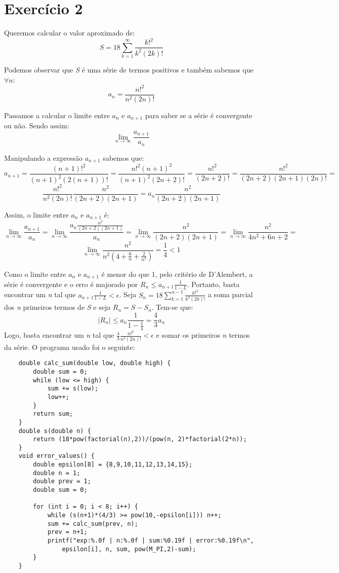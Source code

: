 \documentclass[12pt, letterpaper]{article}
\begin{document}
\section*{Exercício 2}
Queremos calcular o valor aproximado de:
\[S=18\sum_{k=1}^{\infty}\frac{k!^2}{k^2(2k)!}\]

Podemos observar que \textit{S} é uma série de termos positivos e também sabemos que $\forall n$:
$$a_n = \frac{n!^2}{n^2(2n)!}$$
\newline

Passamos a calcular o limite entre $a_n$ e $a_{n+1}$ para saber se a série é convergente ou não. Sendo assim: 
$$\lim_{n \to \infty} \frac{a_{n+1}}{a_n}$$
\newline

Manipulando a expressão $a_{n+1}$ sabemos que:
$$a_{n+1} = \frac{(n+1)!^2}{(n+1)^2(2(n+1))!} = \frac{n!^2(n+1)^2}{(n+1)^2(2n+2)!} = \frac{n!^2}{(2n+2)!} = \frac{n!^2}{(2n+2)(2n+1)(2n)!} =$$
$$\frac{n!^2}{n^2(2n)!} \frac{n^2}{(2n+2)(2n+1)} = a_n\frac{n^2}{(2n+2)(2n+1)}$$
\newline

Assim, o limite entre $a_n$ e $a_{n+1}$ é:
$$\lim_{n \to \infty} \frac{a_{n+1}}{a_n} = \lim_{n \to \infty} \frac{a_n \frac{n^2}{(2n+2)(2n+1)}}{a_n} = \lim_{n \to \infty} \frac{n^2}{(2n+2)(2n+1)} = \lim_{n \to \infty} \frac{n^2}{4n^2+6n+2} = $$
$$\lim_{n \to \infty} \frac{n^2}{n^2(4+ \frac{6}{n} + \frac{2}{n^2})} = \frac{1}{4} < 1$$
\newline

Como o limite entre $a_n$ e $a_{n+1}$ é menor do que 1, pelo critério de D'Alembert, a série é convergente e o erro é majorado por $R_n \leq a_{n+1} \frac{1}{1-L}$. Portanto, basta encontrar um \textit{n} tal que $a_{n+1} \frac{1}{1-L} < \epsilon$.
\newline
Seja $S_n=18\sum_{k=1}^{n-1} \frac{k!^2}{k^2(2k)!}$ a soma parcial dos \textit{n} primeiros termos de \textit{S} e seja $R_n = S - S_n$. Tem-se que:
$$|R_n| \leq a_n \frac{1}{1-\frac{1}{4}} = \frac{4}{3} a_n$$
\newline
Logo, basta encontrar um \textit{n} tal que $\frac{4}{3} \frac{n!^2}{n^2(2n)!} < \epsilon$ e somar os primeiros \textit{n} termos da série. O programa usado foi o seguinte:
\begin{verbatim}
    double calc_sum(double low, double high) {
        double sum = 0;
        while (low <= high) {
            sum += s(low);
            low++;
        }
        return sum;
    }
    double s(double n) {
        return (18*pow(factorial(n),2))/(pow(n, 2)*factorial(2*n));
    }
    void error_values() {
        double epsilon[8] = {8,9,10,11,12,13,14,15};
        double n = 1;
        double prev = 1;
        double sum = 0;
    
        for (int i = 0; i < 8; i++) {
            while (s(n+1)*(4/3) >= pow(10,-epsilon[i])) n++;
            sum += calc_sum(prev, n);
            prev = n+1;
            printf("exp:%.0f | n:%.0f | sum:%0.19f | error:%0.19f\n", 
                epsilon[i], n, sum, pow(M_PI,2)-sum);
        }
    }
\end{verbatim}
\end{document}
